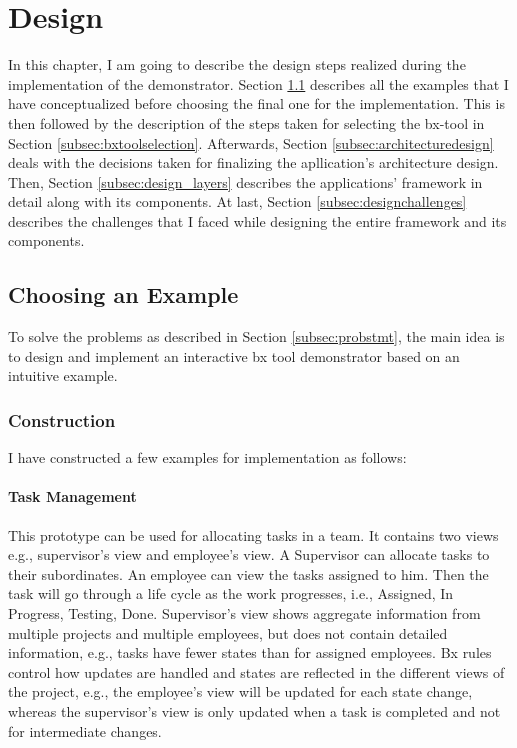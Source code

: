 \section{Design}\label{sec:design}
In this chapter, I am going to describe the design steps realized during the implementation of the demonstrator. Section \ref{subsec:exampleforimplementation} describes all the examples that I have conceptualized before choosing the final one for the implementation. This is then followed by the description of the steps taken for selecting the bx-tool in Section \ref{subsec:bxtoolselection}. Afterwards, Section \ref{subsec:architecturedesign} deals with the decisions taken for finalizing the apllication's architecture design. Then, Section \ref{subsec:design_layers} describes the applications' framework in detail along with its components. At last, Section \ref{subsec:designchallenges} describes the challenges that I faced while designing the entire framework and its components.

\subsection{Choosing an Example}\label{subsec:exampleforimplementation}
To solve the problems as described in Section \ref{subsec:probstmt}, the main idea is to design and implement an interactive bx tool demonstrator based on an intuitive example.

\subsubsection{Construction}\label{subsubsec:exampleconstruction}
I have constructed a few examples for implementation as follows:

\paragraph{Task Management} This prototype can be used for allocating tasks in a team. It contains two views e.g., supervisor's view and employee's view. A Supervisor can allocate tasks to their subordinates. An employee can view the tasks assigned to him. Then the task will go through a life cycle as the work progresses, i.e., Assigned, In Progress, Testing, Done. Supervisor's view shows aggregate information from multiple projects and multiple employees, but does not contain detailed information, e.g., tasks have fewer states than for assigned employees. Bx rules control how updates are handled and states are reflected in the different views of the project, e.g., the employee's view will be updated for each state change, whereas the supervisor's view is only updated when a task is completed and not for intermediate changes.

